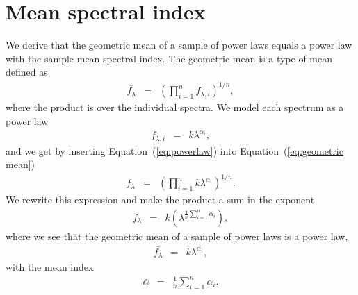 \documentclass{aa}    %
\newcommand{\Eq}[1]{Equation~(\ref{eq:#1})}
\newcommand{\eq}[1]{\Eq{#1}}
\newcommand{\eqlabel}[1]{\label{eq:#1}}
\newcommand{\sectlabel}[1]{\label{sect:#1}}
\begin{document}






\appendix

\section{Mean spectral index}  \sectlabel{math} \label{math}


We derive that the geometric mean of a sample of power laws equals a power law
with the sample mean spectral index. The geometric mean is a type of mean
defined as
\begin{eqnarray}\eqlabel{geometric mean}
\bar{f_{\lambda}} &=&  \left( \prod_{i=1}^n f_{\lambda, i} \right) ^{1/n},
\end{eqnarray}
where the product is over the individual spectra. We model each spectrum as a
power law
\begin{eqnarray}\eqlabel{powerlaw}
f_{\lambda, i} &=&  k \lambda ^{\alpha_{i}},
\end{eqnarray}
and we get by inserting \eq{powerlaw} into \eq{geometric mean}
\begin{eqnarray}\eqlabel{deriv1}
\bar{f_{\lambda}} &=&  \left( \prod_{i=1}^n k \lambda ^{\alpha_{i}}\right)
^{1/n}.
\end{eqnarray}
We rewrite this expression and make the product a sum in the exponent
 \begin{eqnarray}\eqlabel{deriv2}
 \bar{f_{\lambda}} &=&  k \left( \lambda ^{ \frac{1}{n} \sum_{i=1}^n \alpha_{i} 
}\right),
 \end{eqnarray}
where we see that the geometric mean of a sample of power laws is a power law,
 \begin{eqnarray}\eqlabel{deriv3}
 \bar{f_{\lambda}} &=&  k \lambda ^{ \bar{\alpha_{i} }},
 \end{eqnarray}
with the mean index
 \begin{eqnarray}\eqlabel{mean}
 \bar{\alpha} &=&  \frac{1}{n} \sum_{i=1}^n \alpha_{i} .
 \end{eqnarray}
\end{document}
